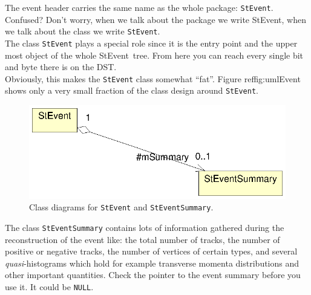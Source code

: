 \documentclass[twoside]{article}
\newcommand{\StEvent}{\textsf{StEvent}}
\begin{document}
The event header carries the same name as the whole package:
\texttt{StEvent}. Confused?  Don't worry, when we talk about the
package we write \StEvent, when we talk about the class we write
\texttt{StEvent}.\\
The class \texttt{StEvent} plays a special role since it is the entry
point and the upper most object of the whole \StEvent\ tree. From here
you
can reach every single bit and byte there is on the DST.\\
Obviously, this makes the \texttt{StEvent} class somewhat ``fat''.
Figure ref{fig:umlEvent} shows only a very
small fraction of the class design around \texttt{StEvent}.
\begin{figure}[htb]
    \begin{center}
        \includegraphics{event.eps}
        \caption{Class diagrams for \texttt{StEvent} and
            \texttt{StEventSummary}.}
        \label{fig:umlEvent}
    \end{center}
\end{figure}
The class \texttt{StEventSummary} contains lots of information
gathered during the reconstruction of the event like: the total number
of tracks, the number of positive or negative tracks, the number of
vertices of certain types, and several \emph{quasi}-histograms which
hold for example transverse momenta distributions and other important
quantities. 
Check the pointer to the event summary before you use it. It could be
\texttt{NULL}.
 
\end{document}
